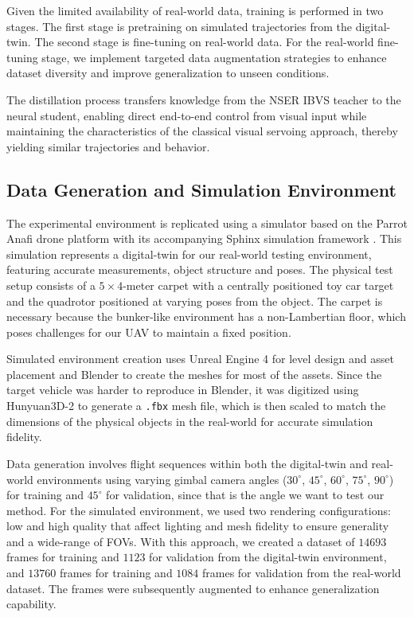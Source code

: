 \documentclass[10pt,twocolumn,letterpaper]{article}
\begin{document}
Given the limited availability of real-world data, training is performed in two stages. The first stage is pretraining on simulated trajectories from the digital-twin. The second stage is fine-tuning on real-world data. For the real-world fine-tuning stage, we implement targeted data augmentation strategies to enhance dataset diversity and improve generalization to unseen conditions.

The distillation process transfers knowledge from the NSER IBVS teacher to the neural student, enabling direct end-to-end control from visual input while maintaining the characteristics of the classical visual servoing approach, thereby yielding similar trajectories and behavior.


\subsection{Data Generation and Simulation Environment}
\label{sec:dataset_sim}

The experimental environment is replicated using a simulator based on the Parrot Anafi drone platform with its accompanying Sphinx simulation framework \cite{WhatisPa31:online}. This simulation represents a digital-twin for our real-world testing environment, featuring accurate measurements, object structure and poses. The physical test setup consists of a $5\times4$-meter carpet with a centrally positioned toy car target and the quadrotor positioned at varying poses from the object. The carpet is necessary because the bunker-like environment has a non-Lambertian floor, which poses challenges for our UAV to maintain a fixed position. 

Simulated environment creation uses Unreal Engine 4 for level design and asset placement and Blender \cite{blender2024} to create the meshes for most of the assets. Since the target vehicle was harder to reproduce in Blender, it was digitized using Hunyuan3D-2 \cite{zhao2025hunyuan3d20scalingdiffusion} to generate a \texttt{.fbx} mesh file, which is then scaled to match the dimensions of the physical objects in the real-world for accurate simulation fidelity.

Data generation involves flight sequences within both the digital-twin and real-world environments using varying gimbal camera angles ($30^\circ$, $45^\circ$, $60^\circ$, $75^\circ$, $90^\circ$) for training and $45^\circ$ for validation, since that is the angle we want to test our method. For the simulated environment, we used two rendering configurations: low and high quality that affect lighting and mesh fidelity to ensure generality and a wide-range of FOVs. With this approach, we created a dataset of $14693$ frames for training and $1123$ for validation from the digital-twin environment, and $13760$ frames for training and $1084$ frames for validation from the real-world dataset. The frames were subsequently augmented to enhance generalization capability.
\end{document}

